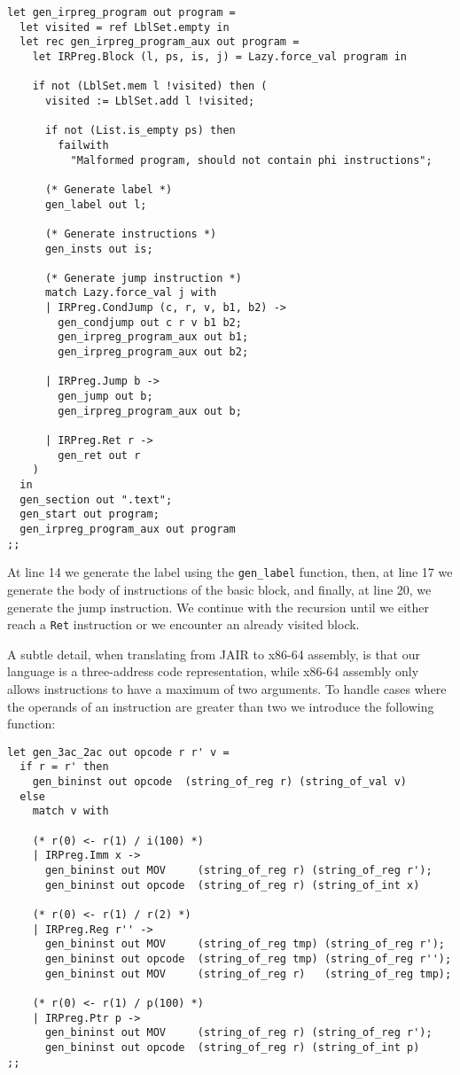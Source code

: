 \begin{lstlisting}[style=OCaml]
let gen_irpreg_program out program =
  let visited = ref LblSet.empty in
  let rec gen_irpreg_program_aux out program =
    let IRPreg.Block (l, ps, is, j) = Lazy.force_val program in

    if not (LblSet.mem l !visited) then (
      visited := LblSet.add l !visited;

      if not (List.is_empty ps) then
        failwith
          "Malformed program, should not contain phi instructions";

      (* Generate label *)
      gen_label out l;

      (* Generate instructions *)
      gen_insts out is;

      (* Generate jump instruction *)
      match Lazy.force_val j with
      | IRPreg.CondJump (c, r, v, b1, b2) ->
        gen_condjump out c r v b1 b2;
        gen_irpreg_program_aux out b1;
        gen_irpreg_program_aux out b2;

      | IRPreg.Jump b ->
        gen_jump out b;
        gen_irpreg_program_aux out b;

      | IRPreg.Ret r ->
        gen_ret out r
    )
  in
  gen_section out ".text";
  gen_start out program;
  gen_irpreg_program_aux out program
;;
\end{lstlisting}

At line 14 we generate the label using the \texttt{gen\_label} function, then, at line 17 we generate the body of instructions of the basic block, and finally, at line 20, we generate the jump instruction. We continue with the recursion until we either reach a \texttt{Ret} instruction or we encounter an already visited block.

A subtle detail, when translating from JAIR to x86-64 assembly, is that our language is a three-address code representation, while x86-64 assembly only allows instructions to have a maximum of two arguments.
To handle cases where the operands of an instruction are greater than two we introduce the following function:

\begin{lstlisting}[style=OCaml]
let gen_3ac_2ac out opcode r r' v =
  if r = r' then
    gen_bininst out opcode  (string_of_reg r) (string_of_val v)
  else
    match v with

    (* r(0) <- r(1) / i(100) *)
    | IRPreg.Imm x ->
      gen_bininst out MOV     (string_of_reg r) (string_of_reg r');
      gen_bininst out opcode  (string_of_reg r) (string_of_int x)

    (* r(0) <- r(1) / r(2) *)
    | IRPreg.Reg r'' ->
      gen_bininst out MOV     (string_of_reg tmp) (string_of_reg r');
      gen_bininst out opcode  (string_of_reg tmp) (string_of_reg r'');
      gen_bininst out MOV     (string_of_reg r)   (string_of_reg tmp);

    (* r(0) <- r(1) / p(100) *)
    | IRPreg.Ptr p ->
      gen_bininst out MOV     (string_of_reg r) (string_of_reg r');
      gen_bininst out opcode  (string_of_reg r) (string_of_int p)
;;
\end{lstlisting}

